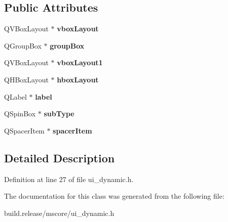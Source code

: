 \subsection*{Public Attributes}
\begin{DoxyCompactItemize}
\item 
\mbox{\label{class_ui___dynamic_base_a95fca817a2ea2312144479484038a24d}} 
Q\+V\+Box\+Layout $\ast$ {\bfseries vbox\+Layout}
\item 
\mbox{\label{class_ui___dynamic_base_ad1577f80df092ea7b531c5f34e39c346}} 
Q\+Group\+Box $\ast$ {\bfseries group\+Box}
\item 
\mbox{\label{class_ui___dynamic_base_a17b4f36ca181ff8389e650c6e62d3938}} 
Q\+V\+Box\+Layout $\ast$ {\bfseries vbox\+Layout1}
\item 
\mbox{\label{class_ui___dynamic_base_a818f4ff30a4af70a49f7b180149f9bcc}} 
Q\+H\+Box\+Layout $\ast$ {\bfseries hbox\+Layout}
\item 
\mbox{\label{class_ui___dynamic_base_a913bc97ba8a922b4fe6e9cd8a5521420}} 
Q\+Label $\ast$ {\bfseries label}
\item 
\mbox{\label{class_ui___dynamic_base_a14ecdab2c56ba2c19ad1bfe686c36cf0}} 
Q\+Spin\+Box $\ast$ {\bfseries sub\+Type}
\item 
\mbox{\label{class_ui___dynamic_base_abaea62ab5a058bb1874684f1155a4f01}} 
Q\+Spacer\+Item $\ast$ {\bfseries spacer\+Item}
\end{DoxyCompactItemize}


\subsection{Detailed Description}


Definition at line 27 of file ui\+\_\+dynamic.\+h.



The documentation for this class was generated from the following file\+:\begin{DoxyCompactItemize}
\item 
build.\+release/mscore/ui\+\_\+dynamic.\+h\end{DoxyCompactItemize}
